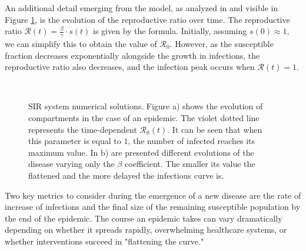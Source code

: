 An additional detail emerging from the model, as analyzed in \cite{Okabe_2020} and visible in Figure \ref{fig:sir_example0}, is the evolution of the reproductive ratio over time. The reproductive ratio $\mathcal{R}(t) = \frac{\beta}{\gamma} \cdot s(t)$ is given by the formula. Initially, assuming $s(0)\approx 1$, we can simplify this to obtain the value of $\mathcal{R}_0$. However, as the susceptible fraction decreases exponentially alongside the growth in infections, the reproductive ratio also decreases, and the infection peak occurs when $\mathcal{R}(t)=1$.


\begin{figure}[h]
	\centering
	 \quad
	 \\
	\caption[SIR dynamic example]{SIR system numerical solutions. Figure a) shows the evolution of compartments in the case of an epidemic. The violet dotted line represents the time-dependent $\mathcal{R}_0(t)$. It can be seen that when this parameter is equal to $1$, the number of infected reaches its maximum value. In b) are presented different evolutions of the disease varying only the $\beta$ coefficient. The smaller its value the flattened and the more delayed the infectious curve is.}
	\label{fig:sir_example0}
\end{figure}
Two key metrics to consider during the emergence of a new disease are the rate of increase of infections and the final size of the remaining susceptible population by the end of the epidemic. The course an epidemic takes can vary dramatically depending on whether it spreads rapidly, overwhelming healthcare systems, or whether interventions succeed in "flattening the curve."

